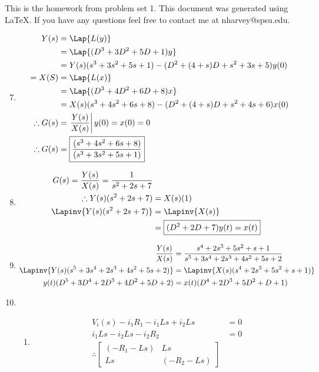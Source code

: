 \documentclass[main.tex]{subfiles}
\begin{document}
This is the homework from problem set 1. This document was generated using
\LaTeX. If you have any questions feel free to contact me at nharvey@spsu.edu.

\begin{enumerate}
	\setcounter{enumi}{6}
	\item
		\begin{align*}
			   Y(s) &= \Lap{L(y)}
			\\ &= \Lap{(D^3+3D^2+5D+1)y}
			\\ &= Y(s)(s^3+3s^2+5s+1)-(D^2+(4+s)D+s^2+3s+5)y(0)
			\\ = X(S) &= \Lap{L(x)}
			\\ &= \Lap{(D^3+4D^2+6D+8)x}
			\\ &= X(s)(s^3+4s^2+6s+8)-(D^2+(4+s)D+s^2+4s+6)x(0)
			\\ \therefore G(s) &= \left. \frac{Y(s)}{X(s)} \right| y(0)=x(0)=0
			\\ \therefore G(s) &= \boxed{\frac{(s^3+4s^2+6s+8)}{(s^3+3s^2+5s+1)}}
		\end{align*}
	\item
		\begin{align*}
			   G(s) = \frac{Y(s)}{X(s)} = \frac{1}{s^2+2s+7}
			\\ \therefore Y(s)(s^2+2s+7) &= X(s)(1)
			\\ \Lapinv{Y(s)(s^2+2s+7)} &= \Lapinv{X(s)}
			\\ &= \boxed{(D^2+2D+7)y(t) = x(t)}
		\end{align*}
	\setcounter{enumi}{9}
	\item
		\begin{align*}
			   \frac{Y(s)}{X(s)} &= \frac{s^4+2s^3+5s^2+s+1}{s^5+3s^4+2s^3+4s^2+5s+2}
			\\ \Lapinv{Y(s)(s^5+3s^4+2s^3+4s^2+5s+2)} &= \Lapinv{X(s)(s^4+2s^3+5s^2+s+1)}
			\\ y(t)(D^5+3D^4+2D^3+4D^2+5D+2) &= x(t)(D^4+2D^3+5D^2+D+1)
		\end{align*}
	\setcounter{enumi}{15}		
	\item
		\begin{enumerate}
			\item
		\begin{align*}
			   V_i(s) - i_1R_1-i_1Ls+i_2Ls &= 0
			\\ i_1Ls - i_2Ls - i_2R_2 &= 0
			\\\therefore 
			\begin{bmatrix}
				     (-R_1-Ls) & Ls
					\\ Ls & (-R_2-Ls)
			\end{bmatrix}

\end{align*}
\end{enumerate}
\end{enumerate}
\end{document}

